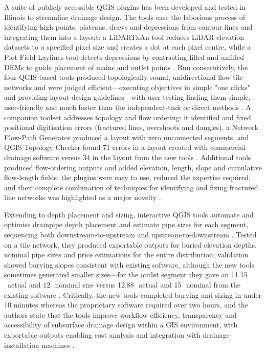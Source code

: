 \documentclass[11pt]{article}
\begin{document}
A suite of publicly accessible QGIS plugins has been developed and tested in Illinois to streamline drainage design. The tools ease the laborious process of identifying high points, plateaus, draws and depressions from contour lines and integrating them into a layout: a LiDARThAn tool reduces LiDAR elevation datasets to a specified pixel size and creates a dot at each pixel centre, while a Plot Field Laylines tool detects depressions by contrasting filled and unfilled DEMs to guide placement of mains and outlet points \parencite{Falasy2025}. Run consecutively, the four QGIS-based tools produced topologically sound, unidirectional flow tile networks and were judged efficient---executing objectives in simple "one clicks" and providing layout-design guidelines---with user testing finding them simple, user-friendly and much faster than the independent-task or direct methods \parencite{Falasy2025}. A companion toolset addresses topology and flow ordering: it identified and fixed positional digitisation errors (fractured lines, overshoots and dangles), a Network Flow-Path Generator produced a layout with zero unconnected segments, and QGIS Topology Checker found 71 errors in a layout created with commercial drainage software versus 34 in the layout from the new tools \parencite{Falasy2024}. Additional tools produced flow-ordering outputs and added elevation, length, slope and cumulative flow-length fields; the plugins were easy to use, reduced the expertise required, and their complete combination of techniques for identifying and fixing fractured line networks was highlighted as a major novelty \parencite{Falasy2024}.

Extending to depth placement and sizing, interactive QGIS tools automate and optimise drainpipe depth placement and estimate pipe sizes for each segment, sequencing both downstream-to-upstream and upstream-to-downstream \parencite{Falasy2025b}. Tested on a tile network, they produced exportable outputs for buried elevation depths, nominal pipe sizes and price estimations for the entire distribution; validation showed burying slopes consistent with existing software, although the new tools sometimes generated smaller sizes---for the outlet segment they gave an 11.15\,\textquotedbl\ actual and 12\,\textquotedbl\ nominal size versus 12.88\,\textquotedbl\ actual and 15\,\textquotedbl\ nominal from the existing software \parencite{Falasy2025b}. Critically, the new tools completed burying and sizing in under 10 minutes whereas the proprietary software required over two hours, and the authors state that the tools improve workflow efficiency, transparency and accessibility of subsurface drainage design within a GIS environment, with exportable outputs enabling cost analysis and integration with drainage-installation machines \parencite{Falasy2025b}.
\end{document}
